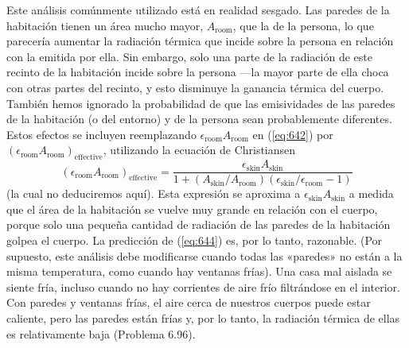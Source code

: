 \documentclass[12pt]{book}
\begin{document}
Este análisis comúnmente utilizado está en realidad sesgado. Las paredes de la habitación tienen un área mucho mayor, $A_{\text{room}}$, que la de la persona, lo que parecería aumentar la radiación térmica que incide sobre la persona en relación con la emitida por ella. Sin embargo, solo una parte de la radiación de este recinto de la habitación incide sobre la persona ---la mayor parte de ella choca con otras partes del recinto, y esto disminuye la ganancia térmica del cuerpo. También hemos ignorado la probabilidad de que las emisividades de las paredes de la habitación (o del entorno) y de la persona sean probablemente diferentes. Estos efectos se incluyen reemplazando $\epsilon_{\text{room}} A_{\text{room}}$ en (\ref{eq:642}) por $(\epsilon_{\text{room}} A_{\text{room}})_{\text{effective}}$, utilizando la ecuación de Christiansen
\begin{equation}
(\epsilon_{\text{room}} A_{\text{room}})_{\text{effective}} = \frac{\epsilon_{\text{skin}} A_{\text{skin}}}{1 + (A_{\text{skin}}/A_{\text{room}})(\epsilon_{\text{skin}}/\epsilon_{\text{room}} - 1)}
\label{eq:645}
\end{equation}
(la cual no deduciremos aquí). Esta expresión se aproxima a $\epsilon_{\text{skin}} A_{\text{skin}}$ a medida que el área de la habitación se vuelve muy grande en relación con el cuerpo, porque solo una pequeña cantidad de radiación de las paredes de la habitación golpea el cuerpo. La predicción de (\ref{eq:644}) es, por lo tanto, razonable. (Por supuesto, este análisis debe modificarse cuando todas las «paredes» no están a la misma temperatura, como cuando hay ventanas frías). Una casa mal aislada se siente fría, incluso cuando no hay corrientes de aire frío filtrándose en el interior. Con paredes y ventanas frías, el aire cerca de nuestros cuerpos puede estar caliente, pero las paredes están frías y, por lo tanto, la radiación térmica de ellas es relativamente baja (Problema 6.96).
\end{document}
